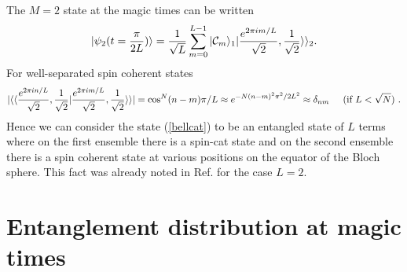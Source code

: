 \documentclass{WileyMSP-template}
\begin{document}
The $ M = 2$ state at the magic times can be written
%
\begin{align}
|\psi_2 (t= \frac{\pi}{2L} )  \rangle = \frac{1}{\sqrt{L}} \sum_{m=0}^{L-1} |{\cal C}_m \rangle_1 |\frac{e^{2 \pi i m/L }}{\sqrt{2}},\frac{1}{\sqrt{2}}\rangle\rangle_2 .
\label{bellcat}
\end{align}
%
For well-separated spin coherent states
%
\begin{equation}
|\langle \langle \frac{e^{2 \pi i n/L }}{\sqrt{2}},\frac{1}{\sqrt{2}} |  \frac{e^{2 \pi i m/L }}{\sqrt{2}},\frac{1}{\sqrt{2}}\rangle\rangle | = \cos^N (n-m)\pi/L   \approx e^{-N (n-m)^2 \pi^2/2 L^2}   \approx \delta_{nm}    \hspace{5mm} \text{(if $ L< \sqrt{N} $) .}
\label{orthogonalscs}
\end{equation}
%
Hence we can consider the state (\ref{bellcat}) to be an entangled state of $ L $ terms where on the first ensemble there is a spin-cat state and on the second ensemble there is a spin coherent state at various positions on the equator of the Bloch sphere.  This fact was already noted in Ref. \cite{byrnes2013fractality} for the case $ L = 2$.






\section{Entanglement distribution at magic times}
\end{document}
